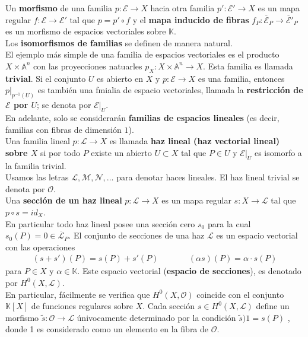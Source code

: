 \documentclass[12pt,a4paper]{report}
\newcommand{\ea}{\mathbb{A}^{n}}
\newcommand{\K}{\mathbb{K}}
\newcommand{\Li}{\mathscr{L}}
\newcommand{\M}{\mathscr{M}}
\begin{document}
Un \textbf{morfismo} de una familia $p:\mathscr{E} \rightarrow X$ hacia otra familia $p':\mathscr{E}' \rightarrow X$ es un mapa regular $f:\mathscr{E} \rightarrow \mathscr{E}' $ tal que $p=p' \circ f$ y el \textbf{mapa inducido de fibras} $f_{P}: \overline{\mathscr{E}}_{P} \rightarrow \overline{\mathscr{E}}'_{P}  $ es un morfismo de espacios vectoriales sobre $\K$.\\ 
Los \textbf{isomorfismos de familias} se definen de manera natural.\\

El ejemplo más simple de una familia de espacios vectoriales es el producto $X \times \ea$ con las proyecciones natuarles $p_{X}:X \times \ea \rightarrow X$. Esta familia es llamada \textbf{trivial}. Si el conjunto $U$ es abierto en $X$ y $p: \mathscr{E} \rightarrow X$ es una familia, entonces $p|_{p^{-1}(U)} $ es también una fmialia de espacio vectoriales, llamada la \textbf{restricción de $\mathscr{E}$ por $U$}; se denota por $ \mathscr{E}|_{U}$.\\

En adelante, solo se considerarán \textbf{familias de espacios lineales} (es decir, familias con fibras de dimensión $1$).\\
Una familia lineal $p: \Li \rightarrow X $ es llamada \textbf{haz lineal (haz vectorial lineal) sobre $X$} si por todo $P$ existe un abierto $U \subset X$ tal que $P \in U$ y $\mathscr{E}|_{U}$ es isomorfo a la familia trivial. \\
Usamos las letras $\Li, \M, \mathscr{N}, \ldots$ para denotar haces lineales. El haz lineal trivial se denota por $\mathscr{O}$.\\

Una \textbf{sección de un haz lineal} $p: \Li \rightarrow X$ es un mapa regular $s:X \rightarrow \Li$ tal que $p \circ s = id_{X}$.\\
En particular todo haz lineal posee una sección cero $s_{0}$ para la cual $s_{0}(P)=0 \in \overline{\Li}_{P}$. El conjunto de secciones de una haz $\Li$ es un espacio vectorial con las operaciones
$$\begin{array}{ccc}
(s+s')(P)= s(P)+ s'(P) & \qquad &(\alpha s) (P)= \alpha \cdot s(P)
\end{array}$$
para $P \in X$ y $\alpha \in \K$. Este espacio vectorial (\textbf{espacio de secciones}), es denotado por $H^{0}(X, \Li)$.\\
En particular, fácilmente se verifica que $H^{0}(X, \mathscr{O})$ coincide con el conjunto $\K[X]$ de funciones regulares sobre $X$. Cada sección $s \in H^{0}(X, \Li)$ define un morfismo $ \tilde{s}: \mathscr{O} \rightarrow \Li$ únivocamente determinado por la condición $\tilde{s} )1=s(P)$ , donde 1 es considerado como un elemento en la fibra de $\mathscr{O}$. \\
\end{document}

